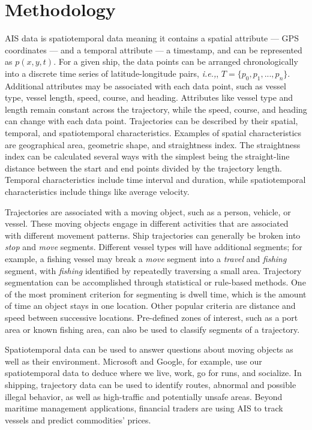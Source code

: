 \documentclass[twoside,symmetric,notoc]{tufte-book}
\newcommand{\hairsp}{\hspace{1pt}}
\newcommand{\ie}{\textit{i.\hairsp{}e.,}\hspace{3pt}}
\begin{document}
\chapter{Methodology}
\label{ch:methods}
\par{%
AIS data is spatiotemporal data meaning it contains a spatial attribute --- GPS coordinates --- and a temporal attribute --- a timestamp, and can be represented as $p(x,y,t)$. For a given ship, the data points can be arranged chronologically into a discrete time series of latitude-longitude pairs, \ie{a trajectory}, $T = \{p_{0}, p_{1},...,p_{n}\}$.\cite{Demsar} Additional attributes may be associated with each data point, such as vessel type, vessel length, speed, course, and heading. Attributes like vessel type and length remain constant across the trajectory, while the speed, course, and heading can change with each data point. Trajectories can be described by their spatial, temporal, and spatiotemporal characteristics. Examples of spatial characteristics are  geographical area, geometric shape, and straightness index. The straightness index can be calculated several ways with the simplest being the straight-line distance between the start and end points divided by the trajectory length. Temporal characteristics include time interval and duration, while spatiotemporal characteristics include things like average velocity.\cite[-0.3in]{Nehal}\cite{Li} 
}
\par{%
Trajectories are associated with a moving object, such as a person, vehicle, or vessel. These moving objects engage in different activities that are associated with different movement patterns. Ship trajectories can generally be broken into \textit{stop} and \textit{move} segments. Different vessel types will have additional segments; for example, a fishing vessel may break a \textit{move} segment into a \textit{travel} and \textit{fishing} segment, with \textit{fishing} identified by repeatedly traversing a small area. Trajectory segmentation can be accomplished through statistical or rule-based methods. One of the most prominent criterion for segmenting is dwell time, which is the amount of time an object stays in one location. Other popular criteria are distance and speed between successive locations.\cite{Demsar} Pre-defined zones of interest, such as a port area or known fishing area, can also be used to classify segments of a trajectory.
}
\par{%
Spatiotemporal data can be used to answer questions about moving objects as well as their environment. Microsoft and Google, for example, use our spatiotemporal data to deduce where we live, work, go for runs, and socialize.\cite{patent} In shipping, trajectory data can be used to identify routes, abnormal and possible illegal behavior, as well as high-traffic and potentially unsafe areas. Beyond maritime management applications, financial traders are using AIS to track vessels and predict commodities' prices.\cite{Button} 
}
\end{document}
